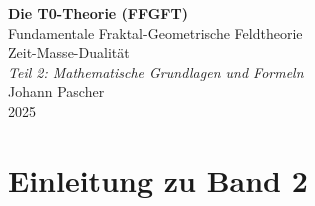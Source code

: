 
	
	\setcounter{section}{0}
	\setcounter{subsection}{0}
	\setcounter{subsubsection}{0}
	\setcounter{paragraph}{0}
	
	\setcounter{secnumdepth}{1}  %
	\makeatletter
	\renewcommand*\l@part[2]{%
		\ifnum \c@tocdepth >-2\relax
		\addpenalty{-\@highpenalty}%
		\addvspace{0.8em \@plus\p@}%
		{\leftskip 0em \relax
			\rightskip \@tocrmarg
			\parfillskip -\rightskip
			\parindent 0em \relax\@afterindenttrue
			\interlinepenalty\@M
			\leavevmode
			{\footnotesize\bfseries #1}\nobreak
			\leaders\hbox{$\m@th\mkern \@dotsep mu\hbox{}\mkern \@dotsep mu$}\hfill
			\nobreak\hb@xt@\@pnumwidth{\hss #2}\par}%
		\addvspace{0.2em \@plus\p@}%
		\nobreak
		\fi}
	\makeatother
	
	\renewcommand{\cftchapfont}{\footnotesize\bfseries}
	\renewcommand{\cftchappagefont}{\footnotesize\bfseries}
	\setlength{\cftbeforechapskip}{0.3em}
	
	\setcounter{tocdepth}{0}
	\begin{titlepage}
		\centering
		\vspace*{2cm}
		
		{\Huge\bfseries Die T0-Theorie (FFGFT)}\\[0.8cm]
		{\LARGE Fundamentale Fraktal-Geometrische Feldtheorie}\\[0.5cm]
		{\LARGE Zeit-Masse-Dualität}\\[1.5cm]
		
		{\Large\itshape Teil 2: Mathematische Grundlagen und Formeln}\\[2cm]
		
		{\large Johann Pascher}\\[1cm]
		
		{\large 2025}
		
		\vfill
	\end{titlepage}
	
	\frontmatter
	\pagestyle{fancy}
	\makeatletter
	\let\ps@plain\ps@fancy
	\let\ps@empty\ps@fancy
	\makeatother
	
	\mainmatter
	\pagestyle{fancy}
	
	\tableofcontents

\chapter{Einleitung zu Band 2}




